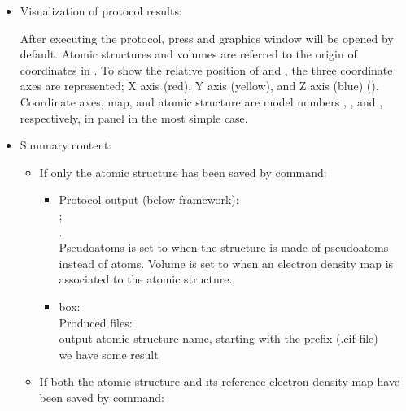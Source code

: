 \begin{itemize}
  \item Visualization of protocol results:
  
    After executing the protocol, press  and \chimera graphics window will be opened by default. Atomic structures and volumes are referred to the origin of coordinates in \chimera. To show the relative position of  and , the three coordinate axes are represented; X axis (red), Y axis (yellow), and Z axis (blue) (). Coordinate axes, map, and atomic structure are model numbers , , and , respectively, in \chimera {} panel in the most simple case.
   
  \item Summary content:
   \begin{itemize}
    \item If only the atomic structure has been saved by  command:

   \begin{itemize}
     \item Protocol output (below \scipion framework):\\
                                        ;\\ .\\Pseudoatoms is set to  when the structure is made of pseudoatoms instead of atoms. Volume is set to  when an electron density map is associated to the atomic structure.
                                \item {} box:\\Produced files:\\output atomic structure name, starting with the prefix (.cif file)\\we have some result
    \end{itemize}
    
   \item If both the atomic structure and its reference electron density map have been saved by  command: 
   

\end{itemize}
\end{itemize}
